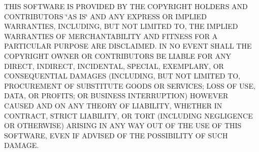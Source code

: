 T\+H\+IS S\+O\+F\+T\+W\+A\+RE IS P\+R\+O\+V\+I\+D\+ED BY T\+HE C\+O\+P\+Y\+R\+I\+G\+HT H\+O\+L\+D\+E\+RS A\+ND C\+O\+N\+T\+R\+I\+B\+U\+T\+O\+RS \char`\"{}\+A\+S I\+S\char`\"{} A\+ND A\+NY E\+X\+P\+R\+E\+SS OR I\+M\+P\+L\+I\+ED W\+A\+R\+R\+A\+N\+T\+I\+ES, I\+N\+C\+L\+U\+D\+I\+NG, B\+UT N\+OT L\+I\+M\+I\+T\+ED TO, T\+HE I\+M\+P\+L\+I\+ED W\+A\+R\+R\+A\+N\+T\+I\+ES OF M\+E\+R\+C\+H\+A\+N\+T\+A\+B\+I\+L\+I\+TY A\+ND F\+I\+T\+N\+E\+SS F\+OR A P\+A\+R\+T\+I\+C\+U\+L\+AR P\+U\+R\+P\+O\+SE A\+RE D\+I\+S\+C\+L\+A\+I\+M\+ED. IN NO E\+V\+E\+NT S\+H\+A\+LL T\+HE C\+O\+P\+Y\+R\+I\+G\+HT O\+W\+N\+ER OR C\+O\+N\+T\+R\+I\+B\+U\+T\+O\+RS BE L\+I\+A\+B\+LE F\+OR A\+NY D\+I\+R\+E\+CT, I\+N\+D\+I\+R\+E\+CT, I\+N\+C\+I\+D\+E\+N\+T\+AL, S\+P\+E\+C\+I\+AL, E\+X\+E\+M\+P\+L\+A\+RY, OR C\+O\+N\+S\+E\+Q\+U\+E\+N\+T\+I\+AL D\+A\+M\+A\+G\+ES (I\+N\+C\+L\+U\+D\+I\+NG, B\+UT N\+OT L\+I\+M\+I\+T\+ED TO, P\+R\+O\+C\+U\+R\+E\+M\+E\+NT OF S\+U\+B\+S\+T\+I\+T\+U\+TE G\+O\+O\+DS OR S\+E\+R\+V\+I\+C\+ES; L\+O\+SS OF U\+SE, D\+A\+TA, OR P\+R\+O\+F\+I\+TS; OR B\+U\+S\+I\+N\+E\+SS I\+N\+T\+E\+R\+R\+U\+P\+T\+I\+ON) H\+O\+W\+E\+V\+ER C\+A\+U\+S\+ED A\+ND ON A\+NY T\+H\+E\+O\+RY OF L\+I\+A\+B\+I\+L\+I\+TY, W\+H\+E\+T\+H\+ER IN C\+O\+N\+T\+R\+A\+CT, S\+T\+R\+I\+CT L\+I\+A\+B\+I\+L\+I\+TY, OR T\+O\+RT (I\+N\+C\+L\+U\+D\+I\+NG N\+E\+G\+L\+I\+G\+E\+N\+CE OR O\+T\+H\+E\+R\+W\+I\+SE) A\+R\+I\+S\+I\+NG IN A\+NY W\+AY O\+UT OF T\+HE U\+SE OF T\+H\+IS S\+O\+F\+T\+W\+A\+RE, E\+V\+EN IF A\+D\+V\+I\+S\+ED OF T\+HE P\+O\+S\+S\+I\+B\+I\+L\+I\+TY OF S\+U\+CH D\+A\+M\+A\+GE. 